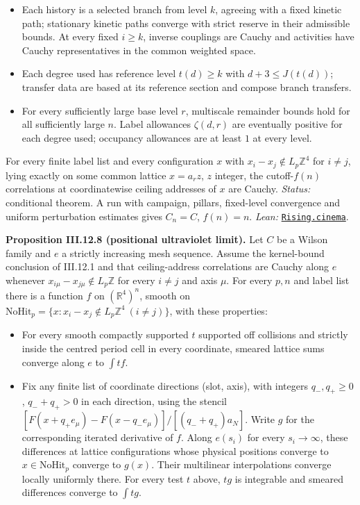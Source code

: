 \documentclass[
  letterpaper,
  11pt]{article}
\providecommand{\tightlist}{%
  \setlength{\itemsep}{0pt}\setlength{\parskip}{0pt}}
\begin{document}
\begin{itemize}
\tightlist
\item
  Each history is a selected branch from level \(k\), agreeing with a
  fixed kinetic path; stationary kinetic paths converge with strict
  reserve in their admissible bounds. At every fixed \(i\ge k\), inverse
  couplings are Cauchy and activities have Cauchy representatives in the
  common weighted space.
\item
  Each degree used has reference level \(t(d)\ge k\) with
  \(d+3\le J(t(d))\); transfer data are based at its reference section
  and compose branch transfers.
\item
  For every sufficiently large base level \(r\), multiscale remainder
  bounds hold for all sufficiently large \(n\). Label allowances
  \(\zeta(d,r)\) are eventually positive for each degree used; occupancy
  allowances are at least \(1\) at every level.
\end{itemize}

For every finite label list and every configuration \(x\) with
\(x_i-x_j\notin L_p\mathbb Z^4\) for \(i\ne j\), lying exactly on some
common lattice \(x=a_rz\), \(z\) integer, the cutoff-\(f(n)\)
correlations at coordinatewise ceiling addresses of \(x\) are Cauchy.
\emph{Status:} conditional theorem. A run with campaign, pillars,
fixed-level convergence and uniform perturbation estimates gives
\(C_n=C\), \(f(n)=n\). \emph{Lean:}
\href{https://github.com/yang-mills-group/OpenAI-YM-20261028/blob/3456e5e75cf8d4cd558955a5c7638fba2d68f464/YM/FullVolume/Fields/Seat.lean\#L37-L45}{\texttt{Rising.cinema}}.

\textbf{Proposition III.12.8 (positional ultraviolet limit).} Let \(C\)
be a Wilson family and \(e\) a strictly increasing mesh sequence. Assume
the kernel-bound conclusion of III.12.1 and that ceiling-address
correlations are Cauchy along \(e\) whenever
\(x_{i\mu}-x_{j\mu}\notin L_p\mathbb Z\) for every \(i\ne j\) and axis
\(\mu\). For every \(p,n\) and label list there is a function \(f\) on
\((\mathbb R^4)^n\), smooth on
\(\mathrm{NoHit}_p=\{x:x_i-x_j\notin L_p\mathbb Z^4\ (i\ne j)\}\), with
these properties:

\begin{itemize}
\tightlist
\item
  For every smooth compactly supported \(t\) supported off collisions
  and strictly inside the centred period cell in every coordinate,
  smeared lattice sums converge along \(e\) to \(\int tf\).
\item
  Fix any finite list of coordinate directions (slot, axis), with
  integers \(q_-,q_+\ge0\), \(q_-+q_+>0\) in each direction, using the
  stencil \([F(x+q_+e_\mu)-F(x-q_-e_\mu)]/[(q_-+q_+)a_N]\). Write \(g\)
  for the corresponding iterated derivative of \(f\). Along \(e(s_i)\)
  for every \(s_i\to\infty\), these differences at lattice
  configurations whose physical positions converge to
  \(x\in\mathrm{NoHit}_p\) converge to \(g(x)\). Their multilinear
  interpolations converge locally uniformly there. For every test \(t\)
  above, \(tg\) is integrable and smeared differences converge to
  \(\int tg\).
\end{itemize}
\end{document}
